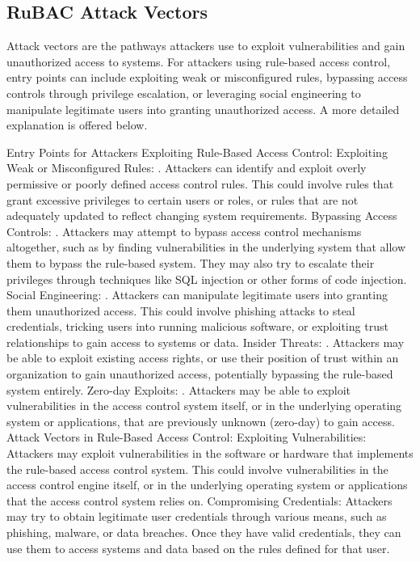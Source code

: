 \subsection{RuBAC Attack Vectors}
Attack vectors are the pathways attackers use to exploit vulnerabilities and gain unauthorized access to systems. For attackers using rule-based access control, entry points can include exploiting weak or misconfigured rules, bypassing access controls through privilege escalation, or leveraging social engineering to manipulate legitimate users into granting unauthorized access. A more detailed explanation is offered below.

Entry Points for Attackers Exploiting Rule-Based Access Control:
Exploiting Weak or Misconfigured Rules:
.
Attackers can identify and exploit overly permissive or poorly defined access control rules. This could involve rules that grant excessive privileges to certain users or roles, or rules that are not adequately updated to reflect changing system requirements. 
Bypassing Access Controls:
.
Attackers may attempt to bypass access control mechanisms altogether, such as by finding vulnerabilities in the underlying system that allow them to bypass the rule-based system. They may also try to escalate their privileges through techniques like SQL injection or other forms of code injection. 
Social Engineering:
.
Attackers can manipulate legitimate users into granting them unauthorized access. This could involve phishing attacks to steal credentials, tricking users into running malicious software, or exploiting trust relationships to gain access to systems or data. 
Insider Threats:
.
Attackers may be able to exploit existing access rights, or use their position of trust within an organization to gain unauthorized access, potentially bypassing the rule-based system entirely. 
Zero-day Exploits:
.
Attackers may be able to exploit vulnerabilities in the access control system itself, or in the underlying operating system or applications, that are previously unknown (zero-day) to gain access. 
Attack Vectors in Rule-Based Access Control:
Exploiting Vulnerabilities:
Attackers may exploit vulnerabilities in the software or hardware that implements the rule-based access control system. This could involve vulnerabilities in the access control engine itself, or in the underlying operating system or applications that the access control system relies on. 
Compromising Credentials:
Attackers may try to obtain legitimate user credentials through various means, such as phishing, malware, or data breaches. Once they have valid credentials, they can use them to access systems and data based on the rules defined for that user. 

